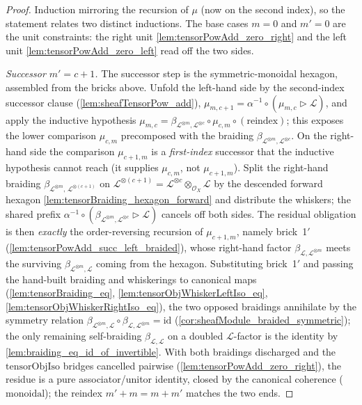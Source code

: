\begin{proof}
  Induction mirroring the recursion of \(\mu\) (now on the second index), so the
  statement relates two distinct inductions. The base cases \(m = 0\) and
  \(m' = 0\) are the unit constraints: the right unit
  \cref{lem:tensorPowAdd_zero_right} and the left unit
  \cref{lem:tensorPowAdd_zero_left} read off the two sides.

  \emph{Successor \(m' = c+1\).} The successor step is the symmetric-monoidal
  hexagon, assembled from the bricks above. Unfold the left-hand side by the
  second-index successor clause (\cref{lem:sheafTensorPow_add}), \(\mu_{m,c+1} =
  \alpha^{-1}\circ(\mu_{m,c}\rhd\mathcal{L})\), and apply the inductive hypothesis
  \(\mu_{m,c} = \beta_{\mathcal{L}^{\otimes m},\mathcal{L}^{\otimes c}}\circ
  \mu_{c,m}\circ(\text{reindex})\); this exposes the lower comparison
  \(\mu_{c,m}\) precomposed with the braiding
  \(\beta_{\mathcal{L}^{\otimes m},\mathcal{L}^{\otimes c}}\). On the right-hand
  side the comparison \(\mu_{c+1,m}\) is a \emph{first-index} successor that the
  inductive hypothesis cannot reach (it supplies \(\mu_{c,m}\), not
  \(\mu_{c+1,m}\)). Split the right-hand braiding
  \(\beta_{\mathcal{L}^{\otimes m},\,\mathcal{L}^{\otimes(c+1)}}\) on
  \(\mathcal{L}^{\otimes(c+1)}=\mathcal{L}^{\otimes c}\otimes_{\mathcal{O}_X}
  \mathcal{L}\) by the descended forward hexagon
  \cref{lem:tensorBraiding_hexagon_forward} and distribute the whiskers; the
  shared prefix \(\alpha^{-1}\circ(\beta_{\mathcal{L}^{\otimes m},
  \mathcal{L}^{\otimes c}}\rhd\mathcal{L})\) cancels off both sides. The residual
  obligation is then \emph{exactly} the order-reversing recursion of
  \(\mu_{c+1,m}\), namely brick~1\('\) (\cref{lem:tensorPowAdd_succ_left_braided}),
  whose right-hand factor \(\beta_{\mathcal{L},\mathcal{L}^{\otimes m}}\) meets the
  surviving \(\beta_{\mathcal{L}^{\otimes m},\mathcal{L}}\) coming from the
  hexagon. Substituting brick~1\('\) and passing the hand-built braiding and
  whiskerings to canonical maps (\cref{lem:tensorBraiding_eq},
  \cref{lem:tensorObjWhiskerLeftIso_eq},
  \cref{lem:tensorObjWhiskerRightIso_eq}), the two opposed braidings annihilate by
  the symmetry relation \(\beta_{\mathcal{L}^{\otimes m},\mathcal{L}}\circ
  \beta_{\mathcal{L},\mathcal{L}^{\otimes m}} = \mathrm{id}\)
  (\cref{cor:sheafModule_braided_symmetric}); the only remaining self-braiding
  \(\beta_{\mathcal{L},\mathcal{L}}\) on a doubled \(\mathcal{L}\)-factor is the
  identity by \cref{lem:braiding_eq_id_of_invertible}. With both braidings
  discharged and the \(\mathrm{tensorObjIso}\) bridges cancelled pairwise
  (\cref{lem:tensorPowAdd_zero_right}), the residue is a pure
  associator/unitor identity, closed by the canonical coherence
  (\(\mathrm{monoidal}\)); the reindex \(m'+m=m+m'\) matches the two ends.
\end{proof}

